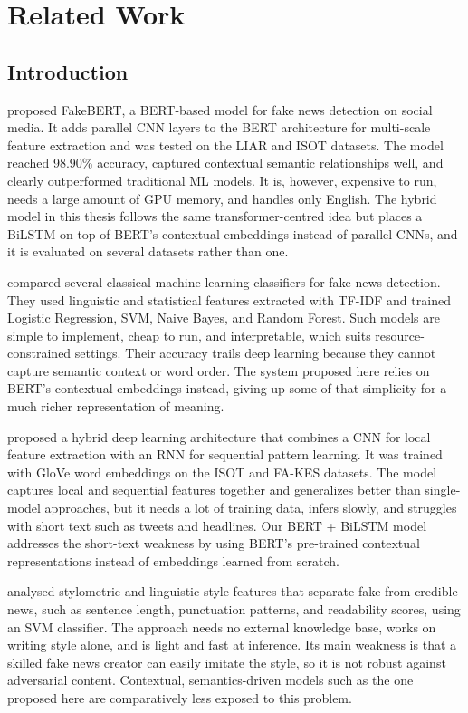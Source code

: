 \sloppy
\chapter{Related Work}
\section{Introduction}

\citep{Kaliyar2021FakeBERT} proposed FakeBERT, a BERT-based model for fake news detection on social media. It adds parallel CNN layers to the BERT architecture for multi-scale feature extraction and was tested on the LIAR and ISOT datasets. The model reached 98.90\% accuracy, captured contextual semantic relationships well, and clearly outperformed traditional ML models. It is, however, expensive to run, needs a large amount of GPU memory, and handles only English. The hybrid model in this thesis follows the same transformer-centred idea but places a BiLSTM on top of BERT's contextual embeddings instead of parallel CNNs, and it is evaluated on several datasets rather than one.

\citep{Aphiwongsophon2021Detecting} compared several classical machine learning classifiers for fake news detection. They used linguistic and statistical features extracted with TF-IDF and trained Logistic Regression, SVM, Naive Bayes, and Random Forest. Such models are simple to implement, cheap to run, and interpretable, which suits resource-constrained settings. Their accuracy trails deep learning because they cannot capture semantic context or word order. The system proposed here relies on BERT's contextual embeddings instead, giving up some of that simplicity for a much richer representation of meaning.

\citep{Nasir2021FakeNews} proposed a hybrid deep learning architecture that combines a CNN for local feature extraction with an RNN for sequential pattern learning. It was trained with GloVe word embeddings on the ISOT and FA-KES datasets. The model captures local and sequential features together and generalizes better than single-model approaches, but it needs a lot of training data, infers slowly, and struggles with short text such as tweets and headlines. Our BERT + BiLSTM model addresses the short-text weakness by using BERT's pre-trained contextual representations instead of embeddings learned from scratch.

\citep{Przybyla2020Capturing} analysed stylometric and linguistic style features that separate fake from credible news, such as sentence length, punctuation patterns, and readability scores, using an SVM classifier. The approach needs no external knowledge base, works on writing style alone, and is light and fast at inference. Its main weakness is that a skilled fake news creator can easily imitate the style, so it is not robust against adversarial content. Contextual, semantics-driven models such as the one proposed here are comparatively less exposed to this problem.

